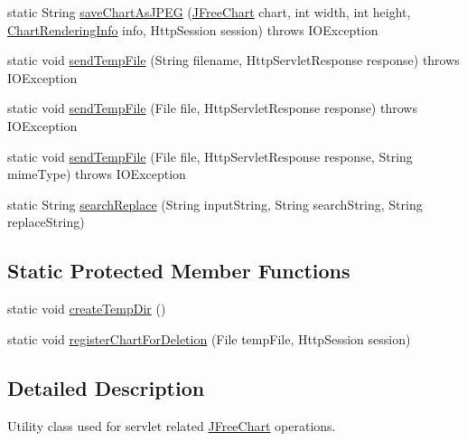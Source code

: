 \begin{DoxyCompactItemize}
\item 
static String \mbox{\hyperlink{classorg_1_1jfree_1_1chart_1_1servlet_1_1_servlet_utilities_a8895ef14220ad16b691c688491e84138}{save\+Chart\+As\+J\+P\+EG}} (\mbox{\hyperlink{classorg_1_1jfree_1_1chart_1_1_j_free_chart}{J\+Free\+Chart}} chart, int width, int height, \mbox{\hyperlink{classorg_1_1jfree_1_1chart_1_1_chart_rendering_info}{Chart\+Rendering\+Info}} info, Http\+Session session)  throws I\+O\+Exception 
\item 
static void \mbox{\hyperlink{classorg_1_1jfree_1_1chart_1_1servlet_1_1_servlet_utilities_a8597dbd6056d5f52241619c4526e8eaf}{send\+Temp\+File}} (String filename, Http\+Servlet\+Response response)  throws I\+O\+Exception 
\item 
static void \mbox{\hyperlink{classorg_1_1jfree_1_1chart_1_1servlet_1_1_servlet_utilities_aad824441b81a28733dad262670f62efe}{send\+Temp\+File}} (File file, Http\+Servlet\+Response response)  throws I\+O\+Exception 
\item 
static void \mbox{\hyperlink{classorg_1_1jfree_1_1chart_1_1servlet_1_1_servlet_utilities_a72ccf8f86d7a8deb8e84714b2dfbf79b}{send\+Temp\+File}} (File file, Http\+Servlet\+Response response, String mime\+Type)  throws I\+O\+Exception 
\item 
static String \mbox{\hyperlink{classorg_1_1jfree_1_1chart_1_1servlet_1_1_servlet_utilities_a64a57d3d1f38d001a22be472a3efba74}{search\+Replace}} (String input\+String, String search\+String, String replace\+String)
\end{DoxyCompactItemize}
\subsection*{Static Protected Member Functions}
\begin{DoxyCompactItemize}
\item 
static void \mbox{\hyperlink{classorg_1_1jfree_1_1chart_1_1servlet_1_1_servlet_utilities_af4bff5a1ae6bd3eb2ae4fe558a52eba6}{create\+Temp\+Dir}} ()
\item 
static void \mbox{\hyperlink{classorg_1_1jfree_1_1chart_1_1servlet_1_1_servlet_utilities_a45621e22d7ed0504923a5145a776535e}{register\+Chart\+For\+Deletion}} (File temp\+File, Http\+Session session)
\end{DoxyCompactItemize}


\subsection{Detailed Description}
Utility class used for servlet related \mbox{\hyperlink{classorg_1_1jfree_1_1chart_1_1_j_free_chart}{J\+Free\+Chart}} operations. 

